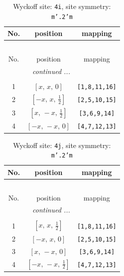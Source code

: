 \documentclass[fleqn,8pt]{jsarticle}
\begin{document}
\renewcommand{\arraystretch}{1.2}
\begin{longtable}{ccc}
\caption{Wyckoff site: {\tt 4i}, site symmetry: {\tt m'.2'm}}
 \\
 \hline \hline
No. & position & mapping \\ \hline \endfirsthead

\multicolumn{2}{l}{\tablename\ \thetable{}} \\
 \hline \hline
No. & position & mapping \\ \hline \endhead

 \hline \hline
\multicolumn{2}{r}{\footnotesize\it continued ...} \\ \endfoot

 \hline \hline
\multicolumn{2}{r}{} \\ \endlastfoot

1 & $\left[ x,\, x,\, 0 \right]$ & {\tt [1,8,11,16]} \\ \hline
2 & $\left[ - x,\, x,\, \frac{1}{2} \right]$ & {\tt [2,5,10,15]} \\ \hline
3 & $\left[ x,\, - x,\, \frac{1}{2} \right]$ & {\tt [3,6,9,14]} \\ \hline
4 & $\left[ - x,\, - x,\, 0 \right]$ & {\tt [4,7,12,13]} \\
\end{longtable}
\renewcommand{\arraystretch}{1.2}
\begin{longtable}{ccc}
\caption{Wyckoff site: {\tt 4j}, site symmetry: {\tt m'.2'm}}
 \\
 \hline \hline
No. & position & mapping \\ \hline \endfirsthead

\multicolumn{2}{l}{\tablename\ \thetable{}} \\
 \hline \hline
No. & position & mapping \\ \hline \endhead

 \hline \hline
\multicolumn{2}{r}{\footnotesize\it continued ...} \\ \endfoot

 \hline \hline
\multicolumn{2}{r}{} \\ \endlastfoot

1 & $\left[ x,\, x,\, \frac{1}{2} \right]$ & {\tt [1,8,11,16]} \\ \hline
2 & $\left[ - x,\, x,\, 0 \right]$ & {\tt [2,5,10,15]} \\ \hline
3 & $\left[ x,\, - x,\, 0 \right]$ & {\tt [3,6,9,14]} \\ \hline
4 & $\left[ - x,\, - x,\, \frac{1}{2} \right]$ & {\tt [4,7,12,13]} \\
\end{longtable}
\end{document}
